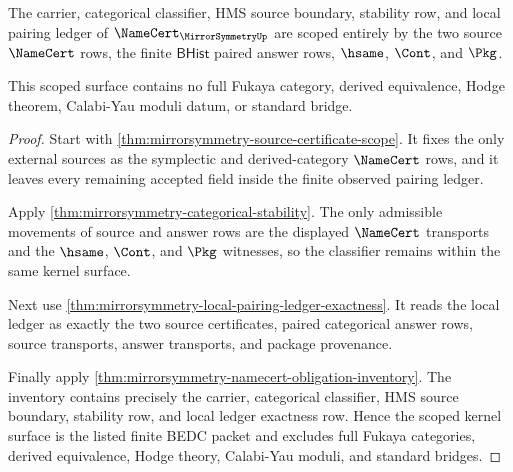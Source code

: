 \begin{theorem}
\label{thm:mirrorsymmetry-scoped-kernel-scope}
The carrier, categorical classifier, HMS source boundary, stability row, and
local pairing ledger of $\NameCert_{\MirrorSymmetryUp}$ are scoped entirely by
the two source $\NameCert$ rows, the finite $\mathsf{BHist}$ paired answer
rows, $\hsame$, $\Cont$, and $\Pkg$.

This scoped surface contains no full Fukaya category, derived equivalence,
Hodge theorem, Calabi-Yau moduli datum, or standard bridge.
\end{theorem}
\begin{proof}
Start with \autoref{thm:mirrorsymmetry-source-certificate-scope}. It fixes the
only external sources as the symplectic and derived-category $\NameCert$ rows,
and it leaves every remaining accepted field inside the finite observed
pairing ledger.

Apply \autoref{thm:mirrorsymmetry-categorical-stability}. The only admissible
movements of source and answer rows are the displayed $\NameCert$ transports
and the $\hsame$, $\Cont$, and $\Pkg$ witnesses, so the classifier remains
within the same kernel surface.

Next use \autoref{thm:mirrorsymmetry-local-pairing-ledger-exactness}. It reads
the local ledger as exactly the two source certificates, paired categorical
answer rows, source transports, answer transports, and package provenance.

Finally apply
\autoref{thm:mirrorsymmetry-namecert-obligation-inventory}. The inventory
contains precisely the carrier, categorical classifier, HMS source boundary,
stability row, and local ledger exactness row. Hence the scoped kernel surface
is the listed finite BEDC packet and excludes full Fukaya categories, derived
equivalence, Hodge theory, Calabi-Yau moduli, and standard bridges.
\end{proof}

